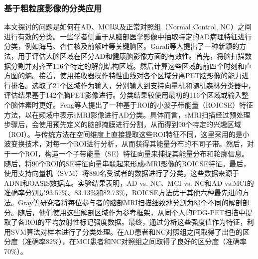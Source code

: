 \subsubsection{基于粗粒度影像的分类应用}
本文探讨的问题是如何在AD、MCI以及正常对照组（Normal Control, NC）之间进行有效的分类。一些学者侧重于从脑部医学影像中抽取特定的AD病理特征进行分类\cite{gray2012multi,garali2015region,feng2021extracting,gray2011regional}，例如海马、杏仁核及前额叶等关键脑区。Garali等人\cite{garali2015region}提出了一种新颖的方法，用于评估大脑区域在区分AD和健康脑影像方面的有效性。首先，将脑扫描数据分割并对齐至116个特定的解剖结构区域。然后计算这些区域的前四个时刻和直方图的熵。接着，使用接收器操作特性曲线对各个区域分离PET脑影像的能力进行排名。选取了21个区域作为输入，分别输入到支持向量机和随机森林分类器中，评估结果基于142个脑PET影像进行。分类结果较使用最初的116个区域或输入整个脑体素时更好。Feng等人\cite{feng2021extracting}提出了一种基于ROI的小波子带能量（ROICSE）特征方法，以在频域中表示sMRI影像进行AD分类。具体而言，sMRI扫描经过预处理步骤后，会使用预先定义的脑部掩膜进行分割，从而得到90个特定的兴趣区域（ROI）。与传统方法在空间维度上直接提取这些ROI特征不同，这里采用的是小波变换技术，对每一个ROI进行分析，从而获得其能量分布的不同子带。然后，对于一个ROI，构造一个子带能量（SE）特征向量来捕捉其能量分布和轮廓信息。随后，将90个ROI的SE特征向量串联起来形成sMRI影像的ROICSE特征。最后，使用支持向量机（SVM）将880名受试者的数据进行了分类，这些数据来源于ADNI和OASIS数据库。实验结果表明，AD vs. NC、MCI vs. NC和AD vs.MCI的准确率分别是93.57\%、83.13\%和82.73\%，ROICSE方法优于其他六种最先进的方法。Gray等研究者\cite{gray2011regional}将每位参与者的脑部MRI扫描细致地分割为83个不同的解剖部分。随后，他们使用这些解剖区域作为参考框架，从同个人的FDG-PET扫描中提取了各ROI的平均放射性标记强度数据。最终，通过分析这些强度值作为特征，利用SVM算法对样本进行了分类处理。在AD患者和NC对照组之间取得了出色的区分度（准确率82\%），在MCI患者和NC对照组之间取得了良好的区分度（准确率70\%）。
